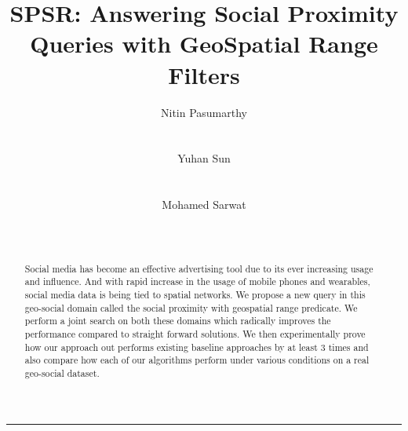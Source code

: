 \documentclass{sig-alternate-05-2015}
\begin{document}
\title{SPSR: Answering Social Proximity Queries with GeoSpatial Range Filters}

\author{
\alignauthor
Nitin Pasumarthy\\
       \\
       \\
\alignauthor
Yuhan Sun\\
       \\
       \\
\alignauthor
Mohamed Sarwat\\
       \\
       \\
}

\maketitle
\begin{abstract}
Social media has become an effective advertising tool due to its ever increasing usage and influence. And with rapid increase in the usage of mobile phones and wearables, social media data is being tied to spatial networks. We propose a new query in this geo-social domain called the social proximity with geospatial range predicate. We perform a joint search on both these domains which radically improves the performance compared to straight forward solutions. We then experimentally prove how our approach out performs existing baseline approaches by at least 3 times and also compare how each of our algorithms perform under various conditions on a real geo-social dataset.
\end{abstract}

\printccsdesc



















\begin{center}\rule{0.5\linewidth}{\linethickness}\end{center}
\end{document}

